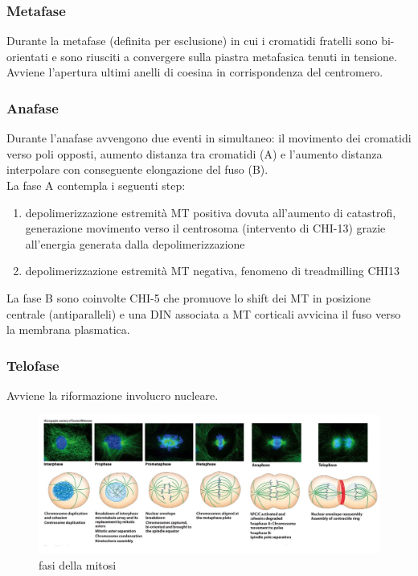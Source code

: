         \subsubsection{Metafase}
            Durante la metafase (definita per esclusione) in cui i cromatidi fratelli sono bi-orientati e sono riusciti a convergere sulla piastra metafasica tenuti in tensione. Avviene l'apertura ultimi anelli di coesina in corrispondenza del centromero.

        \subsubsection{Anafase}
            Durante l'anafase avvengono due eventi in simultaneo: il movimento dei cromatidi verso poli opposti, aumento distanza tra cromatidi (A) e l'aumento distanza interpolare con conseguente elongazione del fuso (B).\\
            La fase A contempla i seguenti step: 
            \begin{enumerate}
                \item depolimerizzazione estremità MT positiva dovuta all’aumento di catastrofi, generazione movimento verso il centrosoma (intervento di CHI-13) grazie all’energia generata dalla depolimerizzazione
                \item depolimerizzazione estremità MT negativa, fenomeno di treadmilling CHI13
            \end{enumerate}
            La fase B sono coinvolte CHI-5 che promuove lo shift dei MT in posizione centrale (antiparalleli) e una DIN associata a MT corticali avvicina il fuso verso la membrana plasmatica.

        \subsubsection{Telofase}
            Avviene la riformazione involucro nucleare.
            
            \begin{figure}[h]
                \centering
                \includegraphics[width=1\textwidth]{images/mitosi.JPG}
                \caption{\small fasi della mitosi}
                \label{fig:mesh1}
            \end{figure}
            
